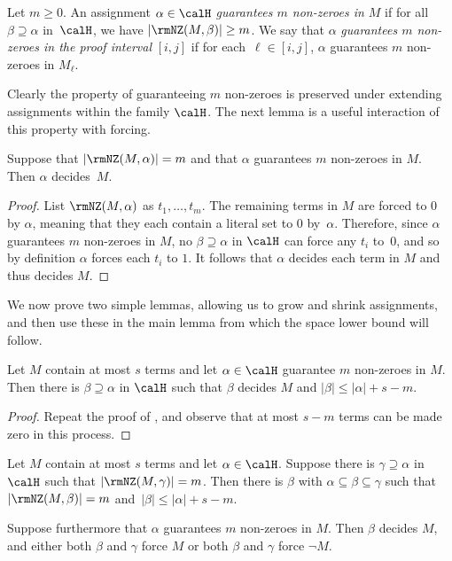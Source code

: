 \begin{definition}
Let $m\geq 0$. 
An assignment $\alpha \in \calH$ \emph{guarantees $m$ non-zeroes in $M$} 
if for all $\beta \supseteq \alpha$ in~$\calH$, we have
  $|\rmNZ(M, \beta)| \ge m$.
We say that $\alpha$ \emph{guarantees $m$ non-zeroes in the proof interval}
$[i,j]$ if for each~$\ell\in [i,j]$, $\alpha$ {guarantees $m$ non-zeroes in $M_\ell$}.
\end{definition}

Clearly the property of guaranteeing $m$ non-zeroes is preserved
under extending assignments within the family $\calH$. 
The next lemma is a useful interaction of this property with forcing.

 \begin{lemma}
\label{lem:NNZ_fixing}
Suppose that $|\rmNZ(M, \alpha)| = m$ and that $\alpha$ guarantees $m$ 
non-zeroes in $M$.
Then $\alpha$ decides~$M$.
\end{lemma}

\begin{proof}
List $\rmNZ(M, \alpha)$ as $t_1, \dots, t_m$.
The remaining terms in $M$ are forced to $0$ by $\alpha$,
meaning that they each contain a literal set to $0$ by~$\alpha$.
Therefore, since $\alpha$ guarantees $m$ non-zeroes in $M$, 
no $\beta \supseteq \alpha$ in $\calH$ can force any $t_i$ to~$0$, 
and so by definition $\alpha$ forces each $t_i$ to $1$.
It follows that $\alpha$ decides each term in $M$ and thus decides $M$.
\end{proof}

We now prove two simple lemmas, allowing us to grow and shrink assignments,
and then use these in the main lemma from which the space lower bound will follow.

\begin{lemma} \label{lem:gen}
Let $M$ contain at most $s$ terms and let $\alpha \in \calH$ guarantee $m$ non-zeroes in $M$. 
Then there is $\beta \supseteq \alpha$ in $\calH$ such that $\beta$ decides $M$ and $|\beta| \leq |\alpha|+ s - m$. 
\end{lemma}

\begin{proof}
Repeat the proof of ,
and observe that at most $s-m$ terms can be 
made zero in this process.
\end{proof}



\begin{lemma}
\label{lem:loc}
Let $M$ contain at most $s$ terms and let $\alpha \in \calH$. 
Suppose there is $\gamma\supseteq \alpha$ in $\calH$ such that \mbox{$|\rmNZ(M, \gamma)|=m$}. 
Then there is $\beta$ with $\alpha \subseteq \beta \subseteq \gamma$ such that $|\rmNZ(M, \beta)|=m$
and~$|\beta| \leq |\alpha| + s-m$.

Suppose furthermore that $\alpha$ guarantees $m$ non-zeroes in $M$.
Then $\beta$ decides $M$, and either both $\beta$ and $\gamma$ force $M$
or both $\beta$ and $\gamma$ force $\neg M$.
\end{lemma}

